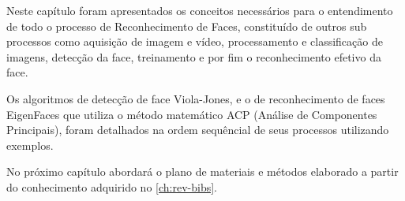 Neste capítulo foram apresentados os conceitos necessários para o entendimento de todo o processo de Reconhecimento de Faces, constituído de outros sub processos como aquisição de imagem e vídeo, processamento e  classificação de imagens, detecção da face, treinamento e por fim o reconhecimento efetivo da face.

Os algoritmos de detecção de face Viola-Jones, e o de reconhecimento de faces EigenFaces que utiliza o método matemático ACP (Análise de Componentes Principais), foram detalhados na ordem sequêncial de seus processos utilizando exemplos.

No próximo capítulo abordará o plano de materiais e métodos elaborado a partir do conhecimento adquirido no \autoref{ch:rev-bibs}.























